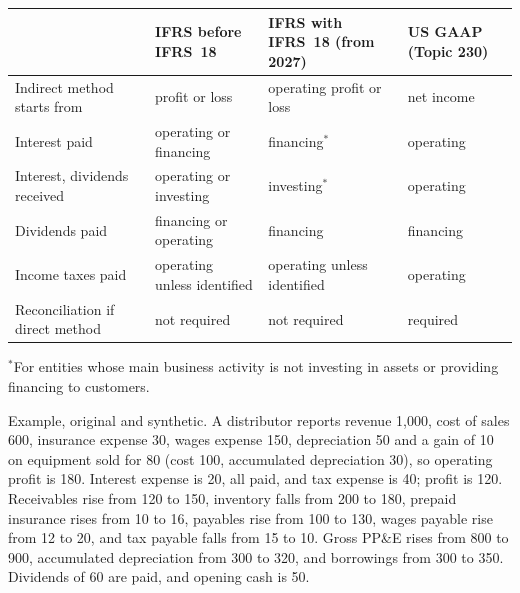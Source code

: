 \begin{qfmethod}
\begin{center}\small
\begin{tabular}{@{}llll@{}}
\toprule
 & IFRS before IFRS~18 & IFRS with IFRS~18 (from 2027) & US GAAP (Topic 230) \\
\midrule
Indirect method starts from & profit or loss & operating profit or loss & net income \\
Interest paid & operating or financing & financing$^{*}$ & operating \\
Interest, dividends received & operating or investing & investing$^{*}$ & operating \\
Dividends paid & financing or operating & financing & financing \\
Income taxes paid & operating unless identified & operating unless identified & operating \\
Reconciliation if direct method & not required & not required & required \\
\bottomrule
\end{tabular}
\end{center}
$^{*}$For entities whose main business activity is not investing in assets or providing financing to customers.

 Example, original and synthetic. A distributor reports revenue 1{,}000, cost of sales 600, insurance expense 30, wages expense 150, depreciation 50 and a gain of 10 on equipment sold for 80 (cost 100, accumulated depreciation 30), so operating profit is 180. Interest expense is 20, all paid, and tax expense is 40; profit is 120. Receivables rise from 120 to 150, inventory falls from 200 to 180, prepaid insurance rises from 10 to 16, payables rise from 100 to 130, wages payable rise from 12 to 20, and tax payable falls from 15 to 10. Gross PP\&E rises from 800 to 900, accumulated depreciation from 300 to 320, and borrowings from 300 to 350. Dividends of 60 are paid, and opening cash is 50.


\end{qfmethod}
